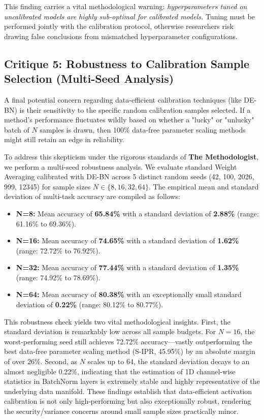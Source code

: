 \documentclass{article}
\begin{document}
This finding carries a vital methodological warning: \textit{hyperparameters tuned on uncalibrated models are highly sub-optimal for calibrated models.} Tuning must be performed jointly with the calibration protocol, otherwise researchers risk drawing false conclusions from mismatched hyperparameter configurations.

\subsection{Critique 5: Robustness to Calibration Sample Selection (Multi-Seed Analysis)}
A final potential concern regarding data-efficient calibration techniques (like DE-BN) is their sensitivity to the specific random calibration samples selected. If a method's performance fluctuates wildly based on whether a "lucky" or "unlucky" batch of $N$ samples is drawn, then 100\% data-free parameter scaling methods might still retain an edge in reliability.

To address this skepticism under the rigorous standards of \textbf{The Methodologist}, we perform a multi-seed robustness analysis. We evaluate standard Weight Averaging calibrated with DE-BN across 5 distinct random seeds (42, 100, 2026, 999, 12345) for sample sizes $N \in \{8, 16, 32, 64\}$. The empirical mean and standard deviation of multi-task accuracy are compiled as follows:
\begin{itemize}
    \item \textbf{N=8:} Mean accuracy of \textbf{65.84\%} with a standard deviation of \textbf{2.88\%} (range: 61.16\% to 69.36\%).
    \item \textbf{N=16:} Mean accuracy of \textbf{74.65\%} with a standard deviation of \textbf{1.62\%} (range: 72.72\% to 76.92\%).
    \item \textbf{N=32:} Mean accuracy of \textbf{77.44\%} with a standard deviation of \textbf{1.35\%} (range: 74.92\% to 78.69\%).
    \item \textbf{N=64:} Mean accuracy of \textbf{80.38\%} with an exceptionally small standard deviation of \textbf{0.22\%} (range: 80.12\% to 80.77\%).
\end{itemize}

This robustness check yields two vital methodological insights. First, the standard deviation is remarkably low across all sample budgets. For $N=16$, the worst-performing seed still achieves 72.72\% accuracy---vastly outperforming the best data-free parameter scaling method (S-IPR, 45.95\%) by an absolute margin of over 26\%. Second, as $N$ scales up to 64, the standard deviation decays to an almost negligible 0.22\%, indicating that the estimation of 1D channel-wise statistics in BatchNorm layers is extremely stable and highly representative of the underlying data manifold. These findings establish that data-efficient activation calibration is not only high-performing but also exceptionally robust, rendering the security/variance concerns around small sample sizes practically minor.
\end{document}
